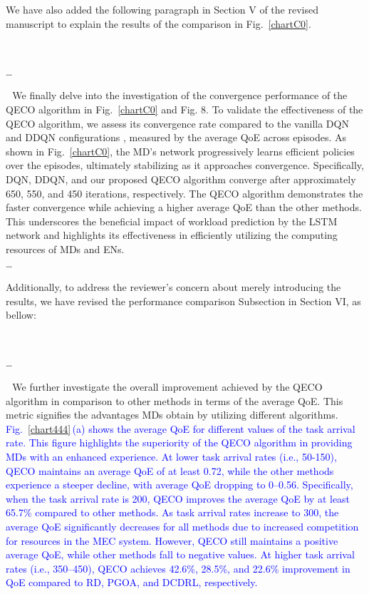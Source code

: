 \documentclass[12pt,draftclsnofoot,onecolumn]{IEEEtran}
\newcommand{\rev}[1]{{\color{blue}#1}} %
\newcommand{\rev}[1]{#1}
\newenvironment{my}[2]%
{\begin{list}{}%
{\setlength{\rightmargin}{#1}\setlength{\leftmargin}{#2}}%


 \item[]{}

} {\end{list}}
\begin{document}
\begin{enumerate}
We have also added the following paragraph in Section V of the revised manuscript to explain the results of the comparison in Fig.~\ref{chartC0}.


		\begin{my}{1cm}{1cm}
	\rev{
		{\ 
			
			\dots 


\,\,\,\,We finally delve into the investigation of the convergence performance of the QECO algorithm in Fig.~\ref{chartC0} and Fig. 8. To validate the effectiveness of the QECO algorithm, we assess its convergence rate compared to the vanilla DQN and DDQN configurations \cite{van2016deep}, measured by the average QoE across episodes. As shown in Fig.~\ref{chartC0}, the MD's network progressively learns efficient policies over the episodes, ultimately stabilizing as it approaches convergence. Specifically, DQN, DDQN, and our proposed QECO algorithm converge after approximately 650, 550, and 450 iterations, respectively. 
The QECO algorithm demonstrates the faster convergence while achieving a higher average QoE than the other methods. This underscores the beneficial impact of workload prediction by the LSTM network and highlights its effectiveness in efficiently utilizing the computing resources of MDs and ENs.\\\dots }}

\end{my}

\vspace{5mm}

Additionally, to address the reviewer's concern about merely introducing the results, we have revised the performance comparison Subsection in Section VI, as bellow: 


		\begin{my}{1cm}{1cm}
	\rev{ 
		{\ 

\dots \color{black}
			
\,\,\,\,We further investigate the overall improvement achieved by the QECO algorithm in comparison to other methods in terms of the average QoE. This metric signifies the advantages MDs obtain by utilizing different algorithms. \textcolor{blue}{Fig.~\ref{chart444}\,(a) shows the average QoE for different values of the task arrival rate. This figure highlights the superiority of the QECO algorithm in providing MDs with an enhanced experience. At lower task arrival rates (i.e., 50-150), QECO maintains an average QoE of at least 0.72, while the other methods experience a steeper decline, with average QoE dropping to 0--0.56. Specifically, when the task arrival rate is 200, QECO improves the average QoE by at least 65.7\% compared to other methods. As task arrival rates increase to 300, the average QoE significantly decreases for all methods due to increased competition for resources in the MEC system. However, QECO still maintains a positive average QoE, while other methods fall to negative values. At higher task arrival rates (i.e., 350–450), QECO achieves 42.6\%, 28.5\%, and 22.6\% improvement in QoE compared to RD, PGOA, and DCDRL, respectively.}\vspace{3mm}



}}
\end{my}
\end{enumerate}
\end{document}
